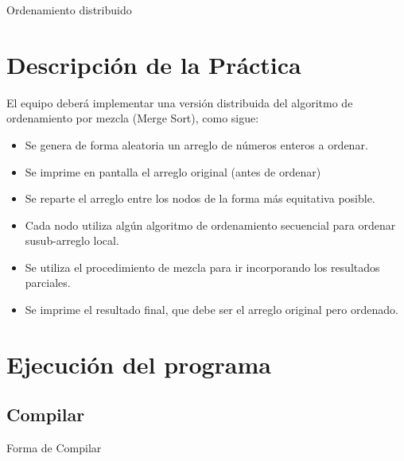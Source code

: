 \documentclass[a4paper,12pt]{article}
\begin{document}


\newpage

\begin{center}
    {\huge Ordenamiento distribuido}
\end{center}


\section*{Descripción de la Práctica}


El equipo deberá implementar una versión distribuida del algoritmo de ordenamiento por
mezcla (Merge Sort), como sigue:
\begin{itemize}
    \item Se genera de forma aleatoria un arreglo de números enteros a ordenar.
    \item Se imprime en pantalla el arreglo original (antes de ordenar)
    \item Se reparte el arreglo entre los nodos de la forma más equitativa posible.
    \item Cada nodo utiliza algún algoritmo de ordenamiento secuencial para ordenar susub-arreglo local.
    \item Se utiliza el procedimiento de mezcla para ir incorporando los resultados parciales.
    \item Se imprime el resultado final, que debe ser el arreglo original pero ordenado.
\end{itemize}






\section*{Ejecución del programa}

\subsection*{Compilar}
\begin{center}    
    Forma de Compilar 
\end{center}
\end{document}
